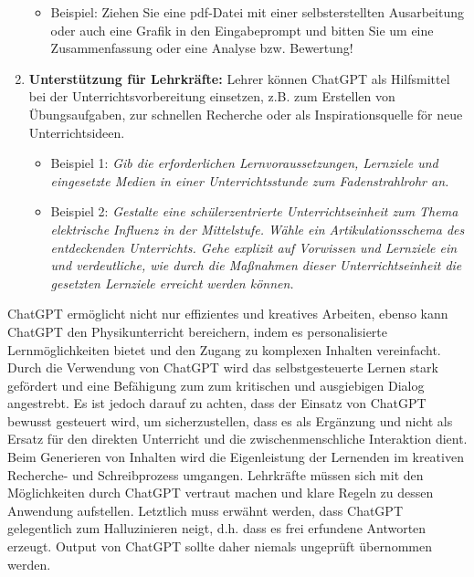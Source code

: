 \begin{enumerate}
	\begin{itemize} 
	\item Beispiel: Ziehen Sie eine pdf-Datei mit einer selbsterstellten Ausarbeitung oder auch eine Grafik in den Eingabeprompt und bitten Sie um eine Zusammenfassung oder eine Analyse bzw. Bewertung!
	\end{itemize}
	
	
\item \textbf{Unterst\"{u}tzung f\"{u}r Lehrkr\"{a}fte:} Lehrer k\"{o}nnen ChatGPT als Hilfsmittel bei der Unterrichtsvorbereitung einsetzen, z.B. zum Erstellen von \"{U}bungsaufgaben, zur schnellen Recherche oder als Inspirationsquelle f\"{o}r neue Unterrichtsideen. 
	\begin{itemize} 
	\item Beispiel 1: {\glqq}\emph{Gib die erforderlichen Lernvoraussetzungen, Lernziele und eingesetzte Medien in einer Unterrichtsstunde zum Fadenstrahlrohr an.}{\grqq} 
	\item Beispiel 2: {\glqq}\emph{Gestalte eine sch\"{u}lerzentrierte Unterrichtseinheit zum Thema elektrische Influenz in der Mittelstufe. W\"{a}hle ein Artikulationsschema des entdeckenden Unterrichts. Gehe explizit auf Vorwissen und Lernziele ein und verdeutliche, wie durch die Ma{\ss}nahmen dieser Unterrichtseinheit die gesetzten Lernziele erreicht werden k\"{o}nnen.}{\grqq} 
	\end{itemize}
\end{enumerate}
\bip

ChatGPT erm\"{o}glicht  nicht nur effizientes und kreatives Arbeiten, ebenso kann ChatGPT  den Physikunterricht bereichern, indem es personalisierte Lernm\"{o}glichkeiten bietet  und den Zugang zu komplexen Inhalten vereinfacht. Durch die Verwendung von ChatGPT wird das selbstgesteuerte Lernen stark gef\"{o}rdert und eine Bef\"{a}higung zum zum kritischen und ausgiebigen Dialog angestrebt.
\mip
Es ist jedoch darauf zu achten, dass der Einsatz von ChatGPT bewusst gesteuert wird, um sicherzustellen, dass es als Erg\"{a}nzung und nicht als Ersatz f\"{u}r den direkten Unterricht und die zwischenmenschliche Interaktion dient. Beim Generieren von Inhalten wird die Eigenleistung der Lernenden im kreativen Recherche- und Schreibprozess umgangen. Lehrkr\"{a}fte m\"{u}ssen sich mit den M\"{o}glichkeiten durch ChatGPT vertraut machen und klare Regeln zu dessen Anwendung aufstellen.
\mip
Letztlich muss erw\"{a}hnt werden, dass ChatGPT gelegentlich zum {\glqq}Halluzinieren{\grqq} neigt, d.h. dass es frei erfundene Antworten erzeugt. Output von ChatGPT sollte daher niemals  ungepr\"{u}ft \"{u}bernommen werden. 

